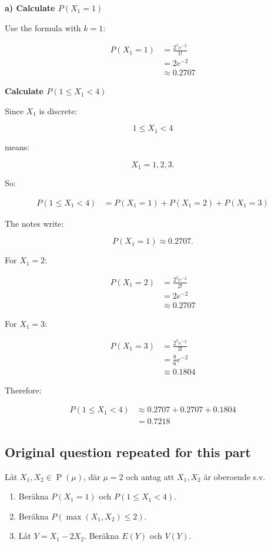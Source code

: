 \documentclass[10pt]{article}
\begin{document}
\textbf{a) Calculate $P(X_1=1)$}

Use the formula with $k=1$:

\begin{align*}
P(X_1=1)
&=
\frac{2^1 e^{-2}}{1!} \\[2mm]
&=
2e^{-2} \\[2mm]
&\approx 0.2707
\end{align*}

\textbf{Calculate $P(1\leq X_1<4)$}

Since $X_1$ is discrete:

\[
1\leq X_1<4
\]

means:

\[
X_1=1,2,3.
\]

So:

\begin{align*}
P(1\leq X_1<4)
&=
P(X_1=1)
+P(X_1=2)
+P(X_1=3)
\end{align*}

The notes write:

\[
P(X_1=1)\approx 0.2707.
\]

For $X_1=2$:

\begin{align*}
P(X_1=2)
&=
\frac{2^2e^{-2}}{2!} \\[2mm]
&=
2e^{-2} \\[2mm]
&\approx 0.2707
\end{align*}

For $X_1=3$:

\begin{align*}
P(X_1=3)
&=
\frac{2^3e^{-2}}{3!} \\[2mm]
&=
\frac{8}{6}e^{-2} \\[2mm]
&\approx 0.1804
\end{align*}

Therefore:

\begin{align*}
P(1\leq X_1<4)
&\approx
0.2707+0.2707+0.1804 \\[2mm]
&=0.7218
\end{align*}

\subsection*{Original question repeated for this part}
Låt $X_1,X_2\in \operatorname{P}(\mu)$, där $\mu=2$ och antag att
$X_1,X_2$ är oberoende s.v.

\begin{enumerate}[label=\alph*)]
\item
Beräkna $P(X_1=1)$ och $P(1\leq X_1<4)$.

\item
Beräkna $P(\max(X_1,X_2)\leq 2)$.

\item
Låt $Y=X_1-2X_2$. Beräkna $E(Y)$ och $V(Y)$.
\end{enumerate}
\end{document}
